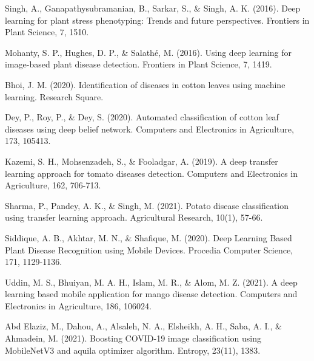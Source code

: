 \documentclass[conference]{IEEEtran}
\begin{document}
\begin{thebibliography}{00}
 Singh, A., Ganapathysubramanian, B., Sarkar, S., \& Singh, A. K. (2016). Deep learning for plant stress phenotyping: Trends and future perspectives. Frontiers in Plant Science, 7, 1510.

 Mohanty, S. P., Hughes, D. P., \& Salathé, M. (2016). Using deep learning for image-based plant disease detection. Frontiers in Plant Science, 7, 1419.

 Bhoi, J. M. (2020). Identification of diseases in cotton leaves using machine learning. Research Square.

 Dey, P., Roy, P., \& Dey, S. (2020). Automated classification of cotton leaf diseases using deep belief network. Computers and Electronics in Agriculture, 173, 105413.

 Kazemi, S. H., Mohsenzadeh, S., \& Fooladgar, A. (2019). A deep transfer learning approach for tomato diseases detection. Computers and Electronics in Agriculture, 162, 706-713.

 Sharma, P., Pandey, A. K., \& Singh, M. (2021). Potato disease classification using transfer learning approach. Agricultural Research, 10(1), 57-66.

 Siddique, A. B., Akhtar, M. N., \& Shafique, M. (2020). Deep Learning Based Plant Disease Recognition using Mobile Devices. Procedia Computer Science, 171, 1129-1136.

 Uddin, M. S., Bhuiyan, M. A. H., Islam, M. R., \& Alom, M. Z. (2021). A deep learning based mobile application for mango disease detection. Computers and Electronics in Agriculture, 186, 106024.


Abd Elaziz, M., Dahou, A., Alsaleh, N. A., Elsheikh, A. H., Saba, A. I., \& Ahmadein, M. (2021). Boosting COVID-19 image classification using MobileNetV3 and aquila optimizer algorithm. Entropy, 23(11), 1383.



\end{thebibliography}






%
%
\end{document}
